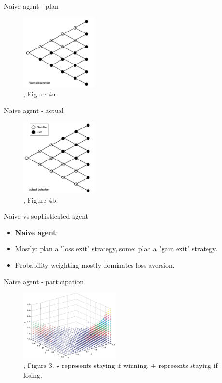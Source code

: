 \documentclass[11pt, aspectratio=169]{beamer}
\begin{document}
\begin{frame}{Naive agent - plan}
\begin{figure}
\centering
    \includegraphics[width = 0.35\textwidth]{naive_plan.png}
    \caption{\citet{Barberis2012a}, Figure 4a.}
    \end{figure}
\end{frame}

\begin{frame}{Naive agent - actual}
\begin{figure}
\centering
    \includegraphics[width = 0.35\textwidth]{naive_final.png}
    \caption{\citet{Barberis2012a}, Figure 4b.}
    \end{figure}
\end{frame}


\begin{frame}{Naive vs sophisticated agent}
    \begin{itemize}
    	\item \textbf{Naive agent}:\medskip
        \item Mostly: plan a "loss exit" strategy, some: plan a "gain exit" strategy.\medskip
        \item Probability weighting mostly  dominates loss aversion.\bigskip
  	    \end{itemize}
\end{frame}

\begin{frame}{Naive agent - participation}
\begin{figure}
\centering
    \includegraphics[width = 0.45\textwidth]{cpt_naive}
    \caption{\citet{Barberis2012a}, Figure 3. $\star$ represents staying if winning. $+$ represents staying if losing.}
    \end{figure}
\end{frame}
\end{document}
